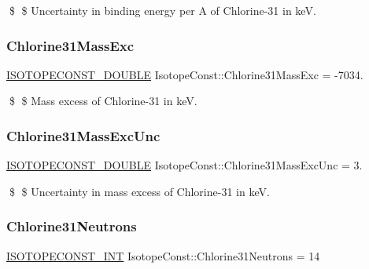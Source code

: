 \$ \$ Uncertainty in binding energy per A of Chlorine-\/31 in keV. \mbox{\label{group___isotope_const-_chlorine-_cl31_gacf69cc29dec9acc6a331e160972676f2}} 
\subsubsection{\texorpdfstring{Chlorine31\+Mass\+Exc}{Chlorine31MassExc}}
{\footnotesize\ttfamily \mbox{\hyperlink{group___isotope_const-_macros_ga8f45a7272ce02c0b4c65c44636ed719a}{I\+S\+O\+T\+O\+P\+E\+C\+O\+N\+S\+T\+\_\+\+D\+O\+U\+B\+LE}} Isotope\+Const\+::\+Chlorine31\+Mass\+Exc = -\/7034.}

\$ \$ Mass excess of Chlorine-\/31 in keV. \mbox{\label{group___isotope_const-_chlorine-_cl31_ga70e19be158e4db51e7fe897eaf3fe692}} 
\subsubsection{\texorpdfstring{Chlorine31\+Mass\+Exc\+Unc}{Chlorine31MassExcUnc}}
{\footnotesize\ttfamily \mbox{\hyperlink{group___isotope_const-_macros_ga8f45a7272ce02c0b4c65c44636ed719a}{I\+S\+O\+T\+O\+P\+E\+C\+O\+N\+S\+T\+\_\+\+D\+O\+U\+B\+LE}} Isotope\+Const\+::\+Chlorine31\+Mass\+Exc\+Unc = 3.}

\$ \$ Uncertainty in mass excess of Chlorine-\/31 in keV. \mbox{\label{group___isotope_const-_chlorine-_cl31_gad310506de90ccd94fe01f77506a05b43}} 
\subsubsection{\texorpdfstring{Chlorine31\+Neutrons}{Chlorine31Neutrons}}
{\footnotesize\ttfamily \mbox{\hyperlink{group___isotope_const-_macros_ga5f18360b3e99483a35c32d789e62621c}{I\+S\+O\+T\+O\+P\+E\+C\+O\+N\+S\+T\+\_\+\+I\+NT}} Isotope\+Const\+::\+Chlorine31\+Neutrons = 14}

